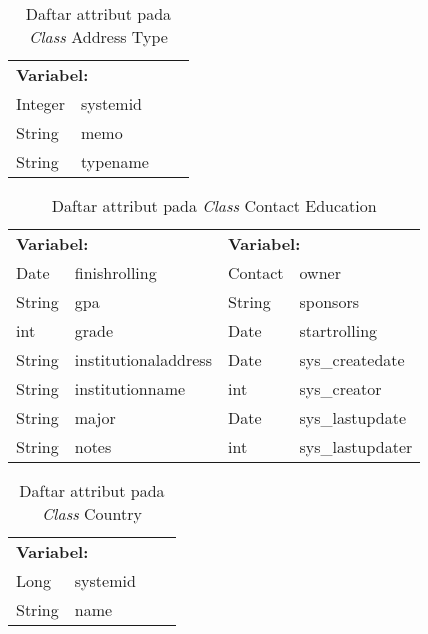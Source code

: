 \begin{table}[H]
	\caption{Daftar attribut pada \textit{Class} Address Type}
	\centering
	\small
	\begin{adjustbox}{width=1\textwidth}	
		\begin{tabular}{|p{4cm} p{2.1cm} p{3cm} p{3.1cm}|}
			\hline
			\multicolumn{2}{|l}{\textbf{Variabel:}}&\multicolumn{2}{l|}{\textbf{}}\\
			Integer&systemid&&\\
			String&memo&&\\
			String&typename&&\\
			\hline
		\end{tabular}
	\end{adjustbox}
\end{table}
\begin{table}[H]
	\caption{Daftar attribut pada \textit{Class} Contact Education}
	\centering
	\small
	\begin{adjustbox}{width=1\textwidth}	
		\begin{tabular}{|p{3cm} p{3.1cm} p{3cm} p{3.1cm}|}
			\hline
			\multicolumn{2}{|l}{\textbf{Variabel:}}&\multicolumn{2}{l|}{\textbf{\textbf{Variabel:}}}\\
			Date&finishrolling&Contact&owner\\
			String&gpa&String&sponsors\\
			int&grade&Date&startrolling\\
			String&institutionaladdress&Date&sys\_createdate\\
			String&institutionname&int&sys\_creator\\
			String&major&Date&sys\_lastupdate\\
			String&notes&int&sys\_lastupdater\\
			\hline
		\end{tabular}
	\end{adjustbox}
\end{table}
\begin{table}[H]
	\caption{Daftar attribut pada \textit{Class} Country}
	\centering
	\small
	\begin{adjustbox}{width=1\textwidth}	
		\begin{tabular}{|p{4cm} p{2.1cm} p{3cm} p{3.1cm}|}
			\hline
			\multicolumn{2}{|l}{\textbf{Variabel:}}&\multicolumn{2}{l|}{\textbf{}}\\
			Long&systemid&&\\
			String&name&&\\
			\hline
		\end{tabular}
	\end{adjustbox}
\end{table}
